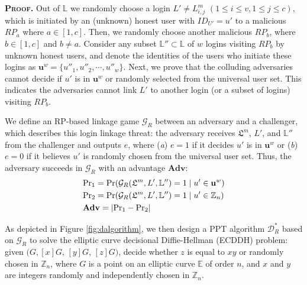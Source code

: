 \noindent\textbf{\textsc{Proof.}} Out of $\mathbb{L}$
 we randomly choose a login $L' \neq L^m_{i,j}$ $(1 \le i \le v, 1 \le j \le c)$,
 which is initiated by an (unknown) honest user with $ID_{U'}=u'$ to a malicious $RP_{a}$ where $a \in [1,c]$.
Then, we randomly choose another malicious $RP_{b}$, where $b \in [1,c]$ and $b \neq a$.
Consider any subset $\mathbb{L}'' \subset \mathbb{L}$ of $w$ logins visiting $RP_{b}$ by unknown honest users,
 and denote the identities of the users who initiate these logins as $\mathbf{u}^w=\{{u''_1}, {u''_2}, \cdots, {u''_w}\}$.
Next, we prove that the colluding adversaries cannot decide if $u'$ is in $\mathbf{u}^w$ or randomly selected from the universal user set.
This indicates the adversaries cannot link $L'$ to another login (or a subset of logins) visiting $RP_{b}$.


We define an RP-based linkage game $\mathcal{G}_R$ between an adversary and a challenger, which describes this login linkage threat: the adversary receives $\mathfrak{L}^m$, $L'$, and $\mathbb{L}''$ from the challenger and outputs $e$, where (\emph{a}) $e = 1$ if it decides $u'$ is in $\mathbf{u}^w$ %
or (\emph{b}) $e=0$ if it believes $u'$ is randomly chosen from the universal user set.
Thus, the adversary succeeds in $\mathcal{G}_R$ with an advantage $\mathbf{Adv}$:
\begin{align*}
&{\rm Pr}_1={\rm Pr}(\mathcal{G}_R(\mathfrak{L}^m, L', \mathbb{L}'')=1 \;| \; u' \in \mathbf{u}^w)  \\
&{\rm Pr}_2={\rm Pr}(\mathcal{G}_R(\mathfrak{L}^m, L', \mathbb{L}'')=1 \; | \; u' \in \mathbb{Z}_n)\\
&{\mathbf{Adv}}=|{\rm Pr}_1-{\rm Pr}_2|
\end{align*}

As depicted in Figure \ref{fig:dalgorithm}, we then design a PPT algorithm $\mathcal{D}^*_R$ based on $\mathcal{G}_R$ to solve the elliptic curve decisional Diffie-Hellman (ECDDH) problem: given $(G, [x]G$, $[y]G$, $[z]G)$, decide whether $z$ is equal to $xy$ or randomly chosen in $\mathbb{Z}_n$, where $G$ is a point on an elliptic curve $\mathbb{E}$ of order $n$, and $x$ and $y$ are integers randomly and independently chosen in $\mathbb{Z}_n$.


